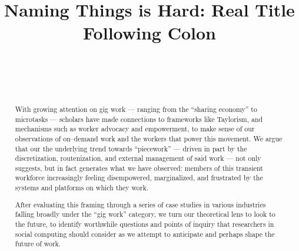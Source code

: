 \documentclass{sigchi}
\def\plaintitle{Naming Things is Hard: Real Title Following Colon}
\begin{document}
\balance{}
\title{\plaintitle}

\author{%
  \\
  \\
  \\
}

\maketitle

\begin{abstract}
  With growing attention on gig work
  --- ranging from the ``sharing economy'' to microtasks ---
  scholars have made connections to frameworks like Taylorism,
  and mechanisms such as worker advocacy and empowerment,
  to make sense of our observations of
  on--demand work and the workers that power this movement.
  We argue that our the underlying trend towards ``piecework''
  --- driven in part by the discretization,
  routenization,
  and external management of said work ---
  not only suggests, but in fact generates what we have observed:
  members of this transient workforce increasingly feeling
  disempowered,
  marginalized,
  and frustrated by the systems and platforms on which they work.
  
  After evaluating this framing
  through a series of case studies
  in various industries falling broadly under the ``gig work'' category,
  we turn our theoretical lens to look to the future,
  to identify worthwhile questions and
  points of inquiry that researchers in social computing should consider
  as we attempt to anticipate and perhaps shape the future of work.
\end{abstract}

 
\end{document}
